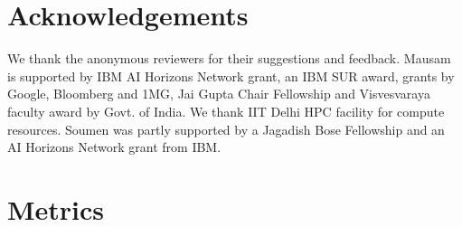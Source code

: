 \documentclass[11pt,a4paper]{article}
\begin{document}
\section*{Acknowledgements}
We thank the anonymous reviewers for their suggestions and feedback. Mausam is supported by IBM AI Horizons Network grant, an IBM SUR award, grants by Google, Bloomberg and 1MG, Jai Gupta Chair Fellowship and Visvesvaraya faculty award by Govt. of India. We thank IIT Delhi HPC facility for compute resources. Soumen was partly supported by a Jagadish Bose Fellowship and an AI Horizons Network grant from IBM.



%
 



\clearpage

\appendix

\section{Metrics}
\label{sec:metrics}
\begin{table*}
\caption{Evaluation of CaRB and CaRB (1-1) on two sentences.}
\label{tab:metrics}
\end{table*}
\end{document}
